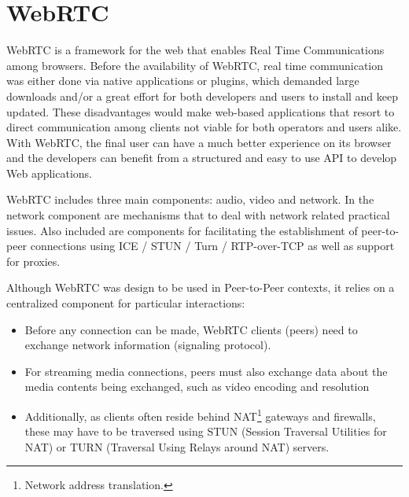 \section{WebRTC}
\label{sec:webrtc}
WebRTC\cite{webrtc} is a framework for the web that enables Real Time Communications among browsers. Before the availability of WebRTC, real time communication was either done via native applications or plugins, which demanded large downloads and/or a great effort for both developers and users to install and keep updated. These disadvantages would make web-based applications that resort to direct communication among clients not viable for both operators and users alike. With WebRTC, the final user can have a much better experience on its browser and the developers can benefit from a structured and easy to use API to develop Web applications.\par
	WebRTC includes three main components: audio, video and network. In the network component are mechanisms that to deal with network related practical issues. Also included are components for facilitating the establishment of peer-to-peer connections using ICE / STUN / Turn / RTP-over-TCP as well as support for proxies.\par
	Although WebRTC was design to be used in Peer-to-Peer contexts, it relies on a centralized component for particular interactions:
	\begin{itemize}
	\item Before any connection can be made, WebRTC clients (peers) need to exchange network information (signaling protocol).
	
	\item For streaming media connections, peers must also exchange data about the media contents being exchanged, such as video encoding and resolution
	
	\item Additionally, as clients often reside behind NAT\footnote{Network address translation.} gateways and firewalls, these may have to be traversed using STUN (Session Traversal Utilities for NAT) or TURN (Traversal Using Relays around NAT) servers.
	\end{itemize}
	
